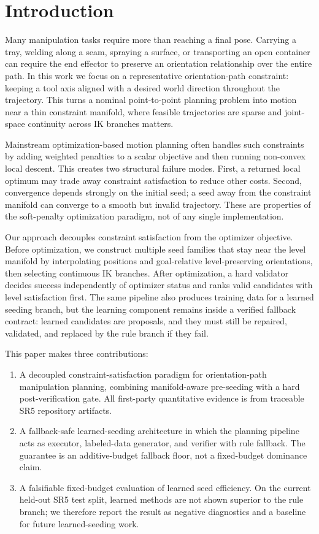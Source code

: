 \documentclass[conference]{IEEEtran/IEEEtran}
\begin{document}
\section{Introduction}
\label{sec:intro}
Many manipulation tasks require more than reaching a final pose. Carrying a
tray, welding along a seam, spraying a surface, or transporting an open
container can require the end effector to preserve an orientation relationship
over the entire path. In this work we focus on a representative
orientation-path constraint: keeping a tool axis aligned with a desired world
direction throughout the trajectory. This turns a nominal point-to-point
planning problem into motion near a thin constraint manifold, where feasible
trajectories are sparse and joint-space continuity across IK branches matters.

Mainstream optimization-based motion planning often handles such constraints by
adding weighted penalties to a scalar objective and then running non-convex
local descent. This creates two structural failure modes. First, a returned
local optimum may trade away constraint satisfaction to reduce other costs.
Second, convergence depends strongly on the initial seed; a seed away from the
constraint manifold can converge to a smooth but invalid trajectory. These are
properties of the soft-penalty optimization paradigm, not of any single
implementation.

Our approach decouples constraint satisfaction from the optimizer objective.
Before optimization, we construct multiple seed families that stay near the
level manifold by interpolating positions and goal-relative level-preserving
orientations, then selecting continuous IK branches. After optimization, a hard
validator decides success independently of optimizer status and ranks valid
candidates with level satisfaction first. The same pipeline also produces
training data for a learned seeding branch, but the learning component remains
inside a verified fallback contract: learned candidates are proposals, and they
must still be repaired, validated, and replaced by the rule branch if they fail.

This paper makes three contributions:
\begin{enumerate}
  \item A decoupled constraint-satisfaction paradigm for orientation-path
  manipulation planning, combining manifold-aware pre-seeding with a hard
  post-verification gate. All first-party quantitative evidence is from
  traceable SR5 repository artifacts.
  \item A fallback-safe learned-seeding architecture in which the planning
  pipeline acts as executor, labeled-data generator, and verifier with rule
  fallback. The guarantee is an additive-budget fallback floor, not a
  fixed-budget dominance claim.
  \item A falsifiable fixed-budget evaluation of learned seed efficiency. On
  the current held-out SR5 test split, learned methods are not shown superior to
  the rule branch; we therefore report the result as negative diagnostics and a
  baseline for future learned-seeding work.
\end{enumerate}
\end{document}
